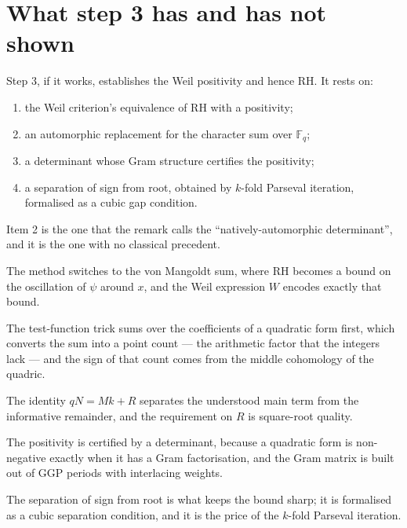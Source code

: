 \section{What step 3 has and has not shown}Step 3, if it works, establishes the Weil positivity and hence RH. It rests
on:

\begin{enumerate}
\item the Weil criterion's equivalence of RH with a positivity;
\item an automorphic replacement for the character sum over $\mathbb{F}_q$;
\item a determinant whose Gram structure certifies the positivity;
\item a separation of sign from root, obtained by $k$-fold Parseval iteration,
formalised as a cubic gap condition.
\end{enumerate}

Item 2 is the one that the remark calls the ``natively-automorphic
determinant'', and it is the one with no classical precedent.

\begin{keytakeaways}
\item The method switches to the von Mangoldt sum, where RH becomes a bound
on the oscillation of $\psi$ around $x$, and the Weil expression $W$ encodes
exactly that bound.
\item The test-function trick sums over the coefficients of a quadratic form
first, which converts the sum into a point count --- the arithmetic factor that
the integers lack --- and the sign of that count comes from the middle
cohomology of the quadric.
\item The identity $qN = Mk + R$ separates the understood main term from the
informative remainder, and the requirement on $R$ is square-root quality.
\item The positivity is certified by a determinant, because a quadratic form is
non-negative exactly when it has a Gram factorisation, and the Gram matrix is
built out of GGP periods with interlacing weights.
\item The separation of sign from root is what keeps the bound sharp; it is
formalised as a cubic separation condition, and it is the price of the
$k$-fold Parseval iteration.
\end{keytakeaways}
